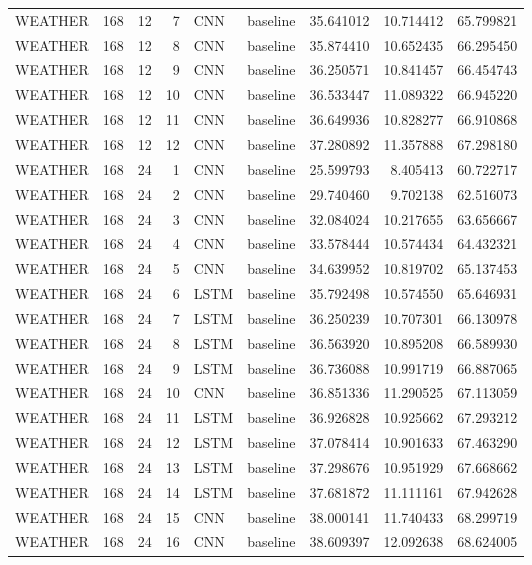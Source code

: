 \begin{table}
\begin{tabular}{lrrrllrrr}
WEATHER & 168 & 12 & 7 & CNN & baseline & 35.641012 & 10.714412 & 65.799821 \\
WEATHER & 168 & 12 & 8 & CNN & baseline & 35.874410 & 10.652435 & 66.295450 \\
WEATHER & 168 & 12 & 9 & CNN & baseline & 36.250571 & 10.841457 & 66.454743 \\
WEATHER & 168 & 12 & 10 & CNN & baseline & 36.533447 & 11.089322 & 66.945220 \\
WEATHER & 168 & 12 & 11 & CNN & baseline & 36.649936 & 10.828277 & 66.910868 \\
WEATHER & 168 & 12 & 12 & CNN & baseline & 37.280892 & 11.357888 & 67.298180 \\
WEATHER & 168 & 24 & 1 & CNN & baseline & 25.599793 & 8.405413 & 60.722717 \\
WEATHER & 168 & 24 & 2 & CNN & baseline & 29.740460 & 9.702138 & 62.516073 \\
WEATHER & 168 & 24 & 3 & CNN & baseline & 32.084024 & 10.217655 & 63.656667 \\
WEATHER & 168 & 24 & 4 & CNN & baseline & 33.578444 & 10.574434 & 64.432321 \\
WEATHER & 168 & 24 & 5 & CNN & baseline & 34.639952 & 10.819702 & 65.137453 \\
WEATHER & 168 & 24 & 6 & LSTM & baseline & 35.792498 & 10.574550 & 65.646931 \\
WEATHER & 168 & 24 & 7 & LSTM & baseline & 36.250239 & 10.707301 & 66.130978 \\
WEATHER & 168 & 24 & 8 & LSTM & baseline & 36.563920 & 10.895208 & 66.589930 \\
WEATHER & 168 & 24 & 9 & LSTM & baseline & 36.736088 & 10.991719 & 66.887065 \\
WEATHER & 168 & 24 & 10 & CNN & baseline & 36.851336 & 11.290525 & 67.113059 \\
WEATHER & 168 & 24 & 11 & LSTM & baseline & 36.926828 & 10.925662 & 67.293212 \\
WEATHER & 168 & 24 & 12 & LSTM & baseline & 37.078414 & 10.901633 & 67.463290 \\
WEATHER & 168 & 24 & 13 & LSTM & baseline & 37.298676 & 10.951929 & 67.668662 \\
WEATHER & 168 & 24 & 14 & LSTM & baseline & 37.681872 & 11.111161 & 67.942628 \\
WEATHER & 168 & 24 & 15 & CNN & baseline & 38.000141 & 11.740433 & 68.299719 \\
WEATHER & 168 & 24 & 16 & CNN & baseline & 38.609397 & 12.092638 & 68.624005 \\

\end{tabular}
\end{table}
